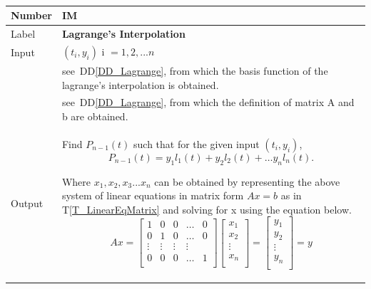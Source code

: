 \documentclass[12pt]{article}
\newcommand{\colAwidth}{0.13\textwidth}
\newcommand{\colBwidth}{0.82\textwidth}
\newcommand{\ddref}[1]{DD\ref{#1}}
\newcommand{\tref}[1]{T\ref{#1}}
\newcounter{instnum} %
\begin{document}
~\newline
\noindent
\begin{minipage}{\textwidth}
	\renewcommand*{\arraystretch}{1.5}
	\begin{tabular}{| p{\colAwidth} | p{\colBwidth}|}
		\hline
		\rowcolor[gray]{0.9}
		Number& IM{instnum}\theinstnum \label{IM_Lagrange}\\
		\hline
		Label& \bf Lagrange's Interpolation\\
		\hline
		
		Input
		& $(t_i,y_i)$ i $= {1,2,...n}$\\
		& see~\ddref{DD_Lagrange}, from which the basis function of the lagrange's interpolation is obtained.\\
		& see~\ddref{DD_Lagrange}, from which the definition of matrix A and b are obtained.\\
		\hline
		
		Output
		&Find $P_{n-1}(t)$ such that for the given input $(t_i,y_i)$,
		\begin{equation*}
		P_{n-1} (t) = y_1 l_1 (t) + y_2 l_2(t) + \dots y_n l_n (t).
		\end{equation*}
		
		Where $x_1, x_2, x_3 ... x_n$ can be obtained by representing the above system of linear equations in matrix form $Ax = b$ as in \tref{T_LinearEqMatrix} and solving for x using the equation below.
		\begin{equation*}
	Ax = \begin{bmatrix}
		1 & 0 & 0 & \dots & 0 \\
		0 & 1 & 0 & \dots & 0 \\
		\vdots & \vdots & \vdots & \vdots \\
		0 & 0 & 0 & \dots & 1 \\
	\end{bmatrix}
	\begin{bmatrix}
	x_1  \\
	x_2 \\
	\vdots \\
	x_n \\
	\end{bmatrix} = 
	\begin{bmatrix}
	y_1  \\
	y_2 \\
	\vdots \\
	y_n \\
	\end{bmatrix} = y
	\end{equation*}\\ 
	

\end{tabular}
\end{minipage}
\end{document}
